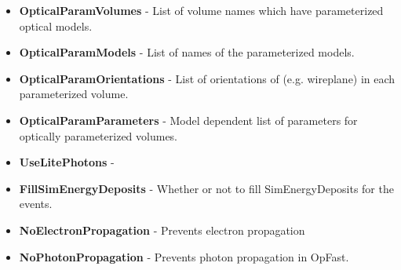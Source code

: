 \documentclass[8pt]{refart}
\begin{document}
\begin{itemize}
    \item \textbf{OpticalParamVolumes} - List of volume names which have parameterized optical models.
    \item \textbf{OpticalParamModels} - List of names of the parameterized models.
    \item \textbf{OpticalParamOrientations} - List of orientations of (e.g. wireplane) in each parameterized volume.
    \item \textbf{OpticalParamParameters} - Model dependent list of parameters for optically parameterized volumes.
    \item \textbf{UseLitePhotons} - 
    \item \textbf{FillSimEnergyDeposits} - Whether or not to fill SimEnergyDeposits for the events. 
    \item \textbf{NoElectronPropagation} - Prevents electron propagation
    \item \textbf{NoPhotonPropagation} - Prevents photon propagation in OpFast.
\end{itemize}
\end{document}
